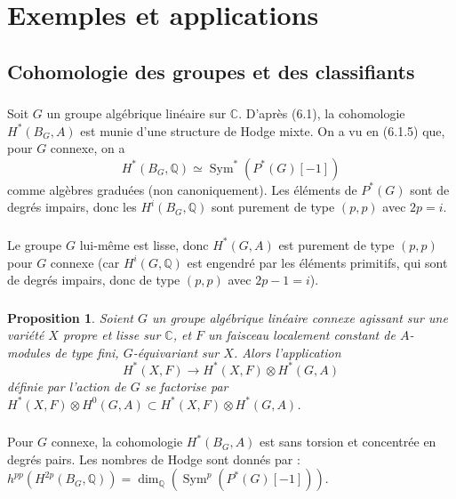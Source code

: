 \documentclass[11pt]{amsart}
\theoremstyle{plain}
\newtheorem{proposition}[theorem]{Proposition}
\theoremstyle{definition}
\DeclareMathOperator{\Sym}{Sym}
\newcommand{\CC}{\mathbb{C}}
\newcommand{\QQ}{\mathbb{Q}}
\begin{document}
\section{Exemples et applications}

\subsection{Cohomologie des groupes et des classifiants}

\subsubsection{}
Soit $G$ un groupe alg\'ebrique lin\'eaire sur $\CC$. D'apr\`es (6.1), la cohomologie $H^*(B_G, A)$ est munie d'une structure de Hodge mixte. On a vu en (6.1.5) que, pour $G$ connexe, on a
\[
H^*(B_G, \QQ) \simeq \Sym^*(P^*(G)[-1])
\]
comme alg\`ebres gradu\'ees (non canoniquement). Les \'el\'ements de $P^*(G)$ sont de degr\'es impairs, donc les $H^i(B_G, \QQ)$ sont purement de type $(p,p)$ avec $2p = i$.

\subsubsection{}
Le groupe $G$ lui-m\^eme est lisse, donc $H^*(G, A)$ est purement de type $(p,p)$ pour $G$ connexe (car $H^i(G, \QQ)$ est engendr\'e par les \'el\'ements primitifs, qui sont de degr\'es impairs, donc de type $(p,p)$ avec $2p-1 = i$).

\subsubsection{}
\begin{proposition}
Soient $G$ un groupe alg\'ebrique lin\'eaire connexe agissant sur une vari\'et\'e $X$ propre et lisse sur $\CC$, et $F$ un faisceau localement constant de $A$-modules de type fini, $G$-\'equivariant sur $X$. Alors l'application
\[
H^*(X, F) \to H^*(X, F) \otimes H^*(G, A)
\]
d\'efinie par l'action de $G$ se factorise par $H^*(X, F) \otimes H^0(G, A) \subset H^*(X, F) \otimes H^*(G, A)$.
\end{proposition}

\subsubsection{}
Pour $G$ connexe, la cohomologie $H^*(B_G, A)$ est sans torsion et concentr\'ee en degr\'es pairs. Les nombres de Hodge sont donn\'es par : $h^{pp}(H^{2p}(B_G, \QQ)) = \dim_\QQ(\Sym^p(P^*(G)[-1]))$.
\end{document}
